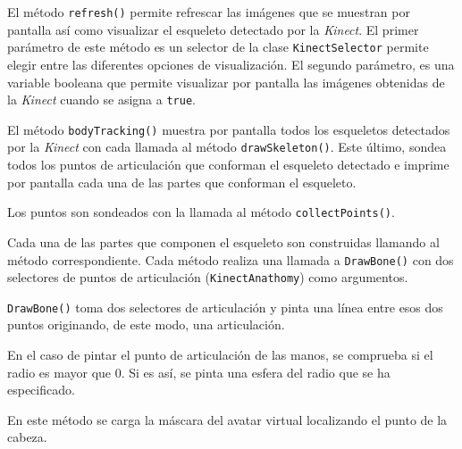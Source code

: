 \documentclass[10pt,a4paper]{report}
\begin{document}
	
	
	El método \texttt{refresh()} permite refrescar las imágenes que se muestran por pantalla así como visualizar el esqueleto detectado por la \textit{Kinect}. El primer parámetro de este método es un selector de la clase \texttt{KinectSelector} permite elegir entre las diferentes opciones de visualización. El segundo parámetro, es una variable booleana que permite visualizar por pantalla las imágenes obtenidas de la \textit{Kinect} cuando se asigna a \texttt{true}.
	
	
	
	El método \texttt{bodyTracking()} muestra por pantalla todos los esqueletos detectados por la \textit{Kinect} con cada llamada al método \texttt{drawSkeleton()}. Este último, sondea todos los puntos de articulación que conforman el esqueleto detectado e imprime por pantalla cada una de las partes que conforman el esqueleto.
	
	
	
	Los puntos son sondeados con la llamada al método \texttt{collectPoints()}.
	
	
	
	Cada una de las partes que componen el esqueleto son construidas llamando al método correspondiente. Cada método realiza una llamada a \texttt{DrawBone()} con dos selectores de puntos de articulación (\texttt{KinectAnathomy}) como argumentos.
	
	
	
	\texttt{DrawBone()} toma dos selectores de articulación y pinta una línea entre esos dos puntos originando, de este modo, una articulación. 
	
	En el caso de pintar el punto de articulación de las manos, se comprueba si el radio es mayor que 0. Si es así, se pinta una esfera del radio que se ha especificado.
	
	En este método se carga la máscara del avatar virtual localizando el punto de la cabeza.
	
	
	
\end{document}
